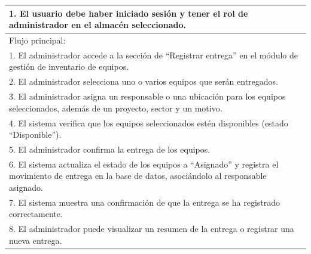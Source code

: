 \documentclass[stu, 12pt, letterpaper, donotrepeattitle, floatsintext, natbib]{apa7}
\begin{document}
\begin{longtable}{@{} p{16.5cm} @{}}
    1. El usuario debe haber iniciado sesi\'on y tener el rol de administrador en el almac\'en seleccionado.                                                                                                                 \\ \midrule
    Flujo principal:                                                                                                                                                                                                         \\
    1. El administrador accede a la secci\'on de ``Registrar entrega'' en el m\'odulo de gesti\'on de inventario de equipos.                                                                                                 \\
    2. El administrador selecciona uno o varios equipos que ser\'an entregados.                                                                                                                                              \\
    3. El administrador asigna un responsable o una ubicaci\'on para los equipos seleccionados, adem\'as de un proyecto, sector y un motivo.                                                                                 \\
    4. El sistema verifica que los equipos seleccionados est\'en disponibles (estado ``Disponible'').                                                                                                                        \\
    5. El administrador confirma la entrega de los equipos.                                                                                                                                                                  \\
    6. El sistema actualiza el estado de los equipos a ``Asignado'' y registra el movimiento de entrega en la base de datos, asoci\'andolo al responsable asignado.                                                          \\
    7. El sistema muestra una confirmaci\'on de que la entrega se ha registrado correctamente.                                                                                                                               \\
    8. El administrador puede visualizar un resumen de la entrega o registrar una nueva entrega.                                                                                                                             \\ \midrule

\end{longtable}
\end{document}
